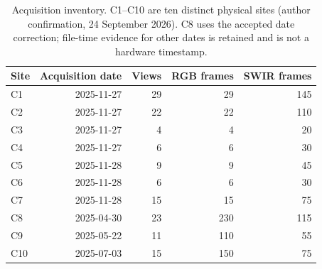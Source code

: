 \begin{table}[htbp]\centering\small
\caption{Acquisition inventory. C1--C10 are ten distinct physical sites (author confirmation, 24 September 2026). C8 uses the accepted date correction; file-time evidence for other dates is retained and is not a hardware timestamp.}
\label{tab:acquisition}
\begin{tabular}{lrrrr}\toprule
Site & Acquisition date & Views & RGB frames & SWIR frames\\\midrule
C1 & 2025-11-27 & 29 & 29 & 145\\
C2 & 2025-11-27 & 22 & 22 & 110\\
C3 & 2025-11-27 & 4 & 4 & 20\\
C4 & 2025-11-27 & 6 & 6 & 30\\
C5 & 2025-11-28 & 9 & 9 & 45\\
C6 & 2025-11-28 & 6 & 6 & 30\\
C7 & 2025-11-28 & 15 & 15 & 75\\
C8 & 2025-04-30 & 23 & 230 & 115\\
C9 & 2025-05-22 & 11 & 110 & 55\\
C10 & 2025-07-03 & 15 & 150 & 75\\
\bottomrule\end{tabular}\end{table}